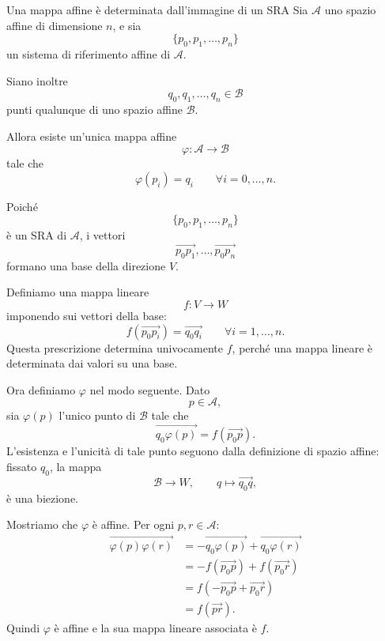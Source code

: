 \documentclass[a4paper]{article}
\begin{document}
\begin{snippetproposition}{Una mappa affine è determinata dall'immagine di un SRA}
    Sia \(\mathcal{A}\) uno spazio affine di dimensione \(n\), e sia
    \[
        \{p_0,p_1,\ldots,p_n\}
    \]
    un sistema di riferimento affine di \(\mathcal{A}\).

    Siano inoltre
    \[
        q_0,q_1,\ldots,q_n\in\mathcal{B}
    \]
    punti qualunque di uno spazio affine \(\mathcal{B}\).

    Allora esiste un'unica mappa affine
    \[
        \varphi:\mathcal{A}\to\mathcal{B}
    \]
    tale che
    \[
        \varphi(p_i)=q_i
        \qquad
        \forall i=0,\ldots,n.
    \]
\end{snippetproposition}

\begin{snippetproof}{}
    Poiché
    \[
        \{p_0,p_1,\ldots,p_n\}
    \]
    è un SRA di \(\mathcal{A}\), i vettori
    \[
        \overrightarrow{p_0p_1},
        \ldots,
        \overrightarrow{p_0p_n}
    \]
    formano una base della direzione \(V\).

    Definiamo una mappa lineare
    \[
        f:V\to W
    \]
    imponendo sui vettori della base:
    \[
        f(\overrightarrow{p_0p_i})
        =
        \overrightarrow{q_0q_i}
        \qquad
        \forall i=1,\ldots,n.
    \]
    Questa prescrizione determina univocamente \(f\), perché una mappa lineare è determinata dai valori su una base.

    Ora definiamo \(\varphi\) nel modo seguente. Dato
    \[
        p\in\mathcal{A},
    \]
    sia \(\varphi(p)\) l'unico punto di \(\mathcal{B}\) tale che
    \[
        \overrightarrow{q_0\varphi(p)}
        =
        f(\overrightarrow{p_0p}).
    \]
    L'esistenza e l'unicità di tale punto seguono dalla definizione di spazio affine: fissato \(q_0\), la mappa
    \[
        \mathcal{B}\to W,
        \qquad
        q\mapsto\overrightarrow{q_0q},
    \]
    è una biezione.

    Mostriamo che \(\varphi\) è affine. Per ogni \(p,r\in\mathcal{A}\):
    \begin{align*}
        \overrightarrow{\varphi(p)\varphi(r)}
        &=
        -\overrightarrow{q_0\varphi(p)}
        +
        \overrightarrow{q_0\varphi(r)}\\
        &=
        -f(\overrightarrow{p_0p})
        +
        f(\overrightarrow{p_0r})\\
        &=
        f(-\overrightarrow{p_0p}+\overrightarrow{p_0r})\\
        &=
        f(\overrightarrow{pr}).
    \end{align*}
    Quindi \(\varphi\) è affine e la sua mappa lineare associata è \(f\).


\end{snippetproof}
\end{document}
